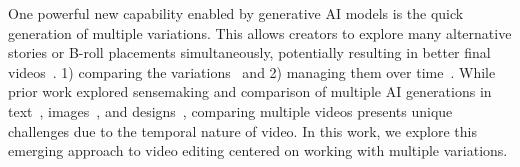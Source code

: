 One powerful new capability enabled by generative AI models is the quick generation of multiple variations. This allows creators to explore many alternative stories or B-roll placements simultaneously, potentially resulting in better final videos~\cite{dow2010parallel, suh2024luminate}.  1) comparing the variations~\cite{huh2023genassist, gero2024supporting} and 2) managing them over time~\cite{reza2023abscribe, suh2024luminate}.
While prior work explored sensemaking and comparison of multiple AI generations in text~\cite{gero2024supporting, suh2023sensecape, reza2023abscribe}, images~\cite{almeda2024prompting, huh2023genassist}, and designs~\cite{swearngin2020scout, matejka2018dream}, comparing multiple videos presents unique challenges due to the temporal nature of video. In this work, we explore this emerging approach to video editing centered on working with multiple variations. 




